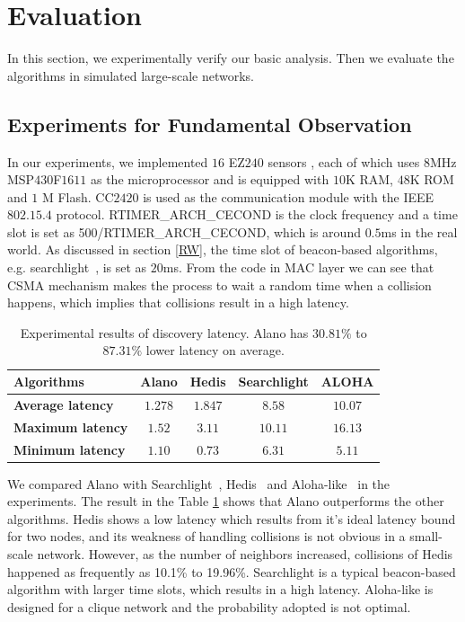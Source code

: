 \section{Evaluation}
\label{Evaluation}

In this section, we experimentally verify our basic analysis.
Then we evaluate the algorithms in simulated large-scale networks.

\subsection{Experiments for Fundamental Observation}

In our experiments, we implemented $16$ EZ$240$ sensors \cite{huang2012easipled}, 
each of which uses $8$MHz MSP$430$F$1611$ 
as the microprocessor and is equipped with $10$K RAM, 
$48$K ROM and $1$ M Flash. CC$2420$ is used as the communication 
module with the IEEE $802.15.4$ protocol. RTIMER\_ARCH\_CECOND is the clock frequency 
and a time slot is set as 500/RTIMER\_ARCH\_CECOND,
which is around $0.5$ms in the real world. As discussed in section \ref{RW}, the time slot of beacon-based 
algorithms, e.g. searchlight~\cite{bakht2012searchlight}, is set as $20$ms.
From the code in MAC layer we can see that CSMA mechanism makes the process to wait a random time 
when a collision happens, which implies that collisions result in a high latency.    

\begin{table}[htbp]
\caption{Experimental results of discovery latency. Alano has $30.81\%$ to $ 87.31\%$ lower latency on average.}
\centering
\begin{tabular}{|l|c|c|c|c|} 
\hline
\textbf{Algorithms} & \textbf{Alano} & \textbf{Hedis} & \textbf{Searchlight} & \textbf{ALOHA} \\
\hline
\textbf{Average latency} & \textbf{$1.278$} & \textbf{$1.847$} & \textbf{$8.58$} & \textbf{$10.07$} \\
\hline
\textbf{Maximum latency} & \textbf{$1.52$} & \textbf{$3.11$} & \textbf{$10.11$} & \textbf{$16.13$} \\
\hline
\textbf{Minimum latency} & \textbf{$1.10$} & \textbf{$0.73$} & \textbf{$6.31$} & \textbf{$5.11$} \\
\hline
\end{tabular}
\label{Exp}
\end{table}

We compared Alano with Searchlight~\cite{bakht2012searchlight}, Hedis~\cite{chen2015heterogeneous}
and Aloha-like~\cite{you2011aloha} in the experiments. The result in the Table \ref{Exp} shows that Alano outperforms the other algorithms.
Hedis shows a low latency which results from it's ideal latency bound for two nodes, 
and its weakness of handling collisions is not obvious in a small-scale network. 
However, as the number of neighbors increased, collisions of Hedis \cite{chen2015heterogeneous} happened as frequently as 10.1\% to 19.96\%.
Searchlight is a typical beacon-based algorithm with larger time slots, which results in a high latency.
Aloha-like is designed for a clique network and the probability adopted is not optimal.


